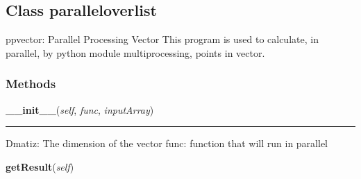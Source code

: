 \subsection{Class paralleloverlist}

    \label{pycosmicstar:paralleloverlist:paralleloverlist}
ppvector: Parallel Processing Vector This program is used to calculate, in 
parallel, by python module multiprocessing, points in vector.



  \subsubsection{Methods}

    \label{pycosmicstar:paralleloverlist:paralleloverlist:__init__}

    \vspace{0.5ex}

\hspace{.8\funcindent}\begin{boxedminipage}{\funcwidth}

    \raggedright \textbf{\_\_init\_\_}(\textit{self}, \textit{func}, \textit{inputArray})

    \vspace{-1.5ex}

    \rule{\textwidth}{0.5\fboxrule}
\setlength{\parskip}{2ex}
    Dmatiz: The dimension of the vector func:  function that will run in 
    parallel

\setlength{\parskip}{1ex}
    \end{boxedminipage}

    \label{pycosmicstar:paralleloverlist:paralleloverlist:getResult}

    \vspace{0.5ex}

\hspace{.8\funcindent}\begin{boxedminipage}{\funcwidth}

    \raggedright \textbf{getResult}(\textit{self})

\setlength{\parskip}{2ex}
\setlength{\parskip}{1ex}
    \end{boxedminipage}

